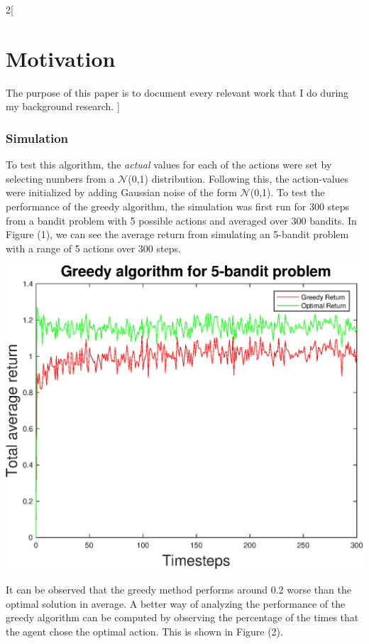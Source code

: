 \documentclass[a4paper]{article}
\newenvironment{Figure}
{\par\medskip\noindent\minipage{\linewidth}}
{\endminipage\par\medskip}
\begin{document}
\begin{multicols}{2}[
		\section*{Motivation}
		The purpose of this paper is to document every relevant work that I do during my background research.
		]
		\subsubsection{Simulation}
		To test this algorithm, the \textit{actual} values for each of the actions were set by selecting numbers from a $\mathcal{N}$(0,1) distribution. Following this, the action-values were initialized by adding Gaussian noise of the form $\mathcal{N}$(0,1). To test the performance of the greedy algorithm, the simulation was first run for 300 steps from a bandit problem with 5 possible actions and averaged over 300 bandits. In Figure (1), we can see the average return from simulating an 5-bandit problem with a range of 5 actions over 300 steps.
		
		\begin{Figure}
			\centering
				\includegraphics[width=\linewidth]{greedyplot1.eps}
		\end{Figure}
		
		It can be observed that the greedy method performs around 0.2 worse than the optimal solution in average. A better way of analyzing the performance of the greedy algorithm can be computed by observing the percentage of the times that the agent chose the optimal action. This is shown in Figure (2).
		

\end{multicols}
\end{document}
